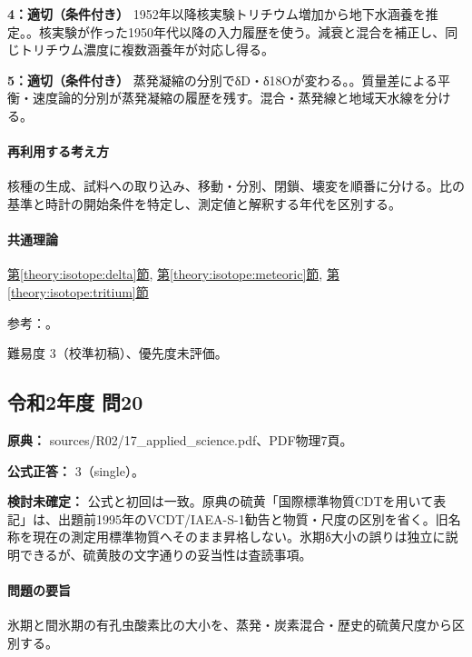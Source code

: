 \noindent\textbf{4：適切（条件付き）} 1952年以降核実験トリチウム増加から地下水涵養を推定。。核実験が作った1950年代以降の入力履歴を使う。減衰と混合を補正し、同じトリチウム濃度に複数涵養年が対応し得る。\par

\noindent\textbf{5：適切（条件付き）} 蒸発凝縮の分別でδD・δ18Oが変わる。。質量差による平衡・速度論的分別が蒸発凝縮の履歴を残す。混合・蒸発線と地域天水線を分ける。\par

\paragraph{再利用する考え方} 核種の生成、試料への取り込み、移動・分別、閉鎖、壊変を順番に分ける。比の基準と時計の開始条件を特定し、測定値と解釈する年代を区別する。

\paragraph{共通理論} \hyperref[theory:isotope:delta]{第\ref*{theory:isotope:delta}節}, \hyperref[theory:isotope:meteoric]{第\ref*{theory:isotope:meteoric}節}, \hyperref[theory:isotope:tritium]{第\ref*{theory:isotope:tritium}節}

\par 参考：\cite{gc_meteoric,iso_tritium_clock,iso_vsmow2}。

\par 難易度 3（校準初稿）、優先度未評価。

\subsection{令和2年度 問20}
\label{q:r02-reg-applied-20}

\noindent\textbf{原典：} sources/R02/17\_applied\_science.pdf、PDF物理7頁。

\textbf{公式正答：} 3（single）。

\par\textbf{検討未確定：} 公式と初回は一致。原典の硫黄「国際標準物質CDTを用いて表記」は、出題前1995年のVCDT/IAEA-S-1勧告と物質・尺度の区別を省く。旧名称を現在の測定用標準物質へそのまま昇格しない。氷期δ大小の誤りは独立に説明できるが、硫黄肢の文字通りの妥当性は査読事項。

\paragraph{問題の要旨} 氷期と間氷期の有孔虫酸素比の大小を、蒸発・炭素混合・歴史的硫黄尺度から区別する。

